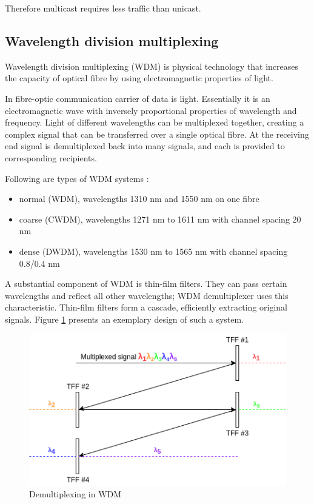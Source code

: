 \documentclass[conference]{IEEEtran}
\begin{document}
Therefore multicast requires less traffic than unicast.

\subsection{Wavelength division multiplexing}
Wavelength division multiplexing (WDM) is physical technology that increases the capacity of optical fibre by using electromagnetic properties of light.

In fibre-optic communication carrier of data is light. Essentially it is an electromagnetic wave with inversely proportional properties of wavelength and frequency. Light of different wavelengths can be multiplexed together, creating a complex signal that can be transferred over a single optical fibre\cite{wdm_general}. At the receiving end signal is demultiplexed back into many signals, and each is provided to corresponding recipients.

Following are types of WDM systems \cite{cwdm} \cite{dwdm}:
\begin{itemize}
	\item normal (WDM), wavelengths 1310 nm and 1550 nm on one fibre
	\item coarse (CWDM), wavelengths 1271 nm to 1611 nm with channel spacing 20 nm
	\item dense (DWDM), wavelengths 1530 nm to 1565 nm with channel spacing 0.8/0.4 nm
\end{itemize}

A substantial component of WDM is thin-film filters. They can pass certain wavelengths and reflect all other wavelengths; WDM demultiplexer uses this characteristic. Thin-film filters form a cascade, efficiently extracting original signals. Figure \ref{demultiplexing} presents an exemplary design of such a system.

\begin{figure}[htbp]
	\centerline{\includegraphics[scale=0.5]{demultiplexer.png}}
	\caption{Demultiplexing in WDM}
	\label{demultiplexing}
\end{figure}
\end{document}
